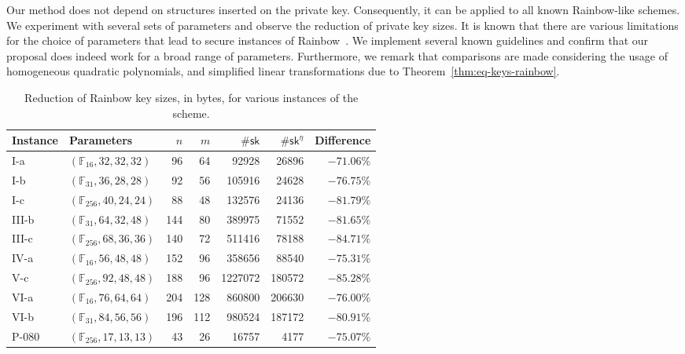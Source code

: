 \documentclass[12pt, a4paper, oneside]{memoir}
\theoremstyle{definition}
\begin{document}
Our method does not depend on structures inserted on the private key. Consequently, it can be applied to all known Rainbow-like schemes. We experiment with several sets of parameters and observe the reduction of private key sizes. It is known that there are various limitations for the choice of parameters that lead to secure instances of Rainbow~\cite{Petzoldt:201005}. We implement several known guidelines and confirm that our proposal does indeed work for a broad range of parameters. Furthermore, we remark that comparisons are made considering the usage of homogeneous quadratic polynomials, and simplified linear transformations due to Theorem~\ref{thm:eq-keys-rainbow}.

\begin{table}[htbp]
  \renewcommand{\arraystretch}{1.2}
  \setlength{\tabcolsep}{6.5pt}
  \centering
  \caption{Reduction of Rainbow key sizes, in bytes, for various instances of the scheme.}\label{tab:eta-diff}
  \begin{tabular}{*{2}{l}*{5}{r}}
    \toprule
    Instance & Parameters & $n$ & $m$ & $\#\mathsf{sk}$ & $\#\mathsf{sk}^{\eta}$ & Difference \\ \midrule
    I-a   & $(\mathbb{F}_{ 16}, 32, 32, 32)$ &  96 &  64 & \num{   92928} & \num{  26896} & $-71.06\%$ \\
    I-b   & $(\mathbb{F}_{ 31}, 36, 28, 28)$ &  92 &  56 & \num{  105916} & \num{  24628} & $-76.75\%$ \\
    I-c   & $(\mathbb{F}_{256}, 40, 24, 24)$ &  88 &  48 & \num{  132576} & \num{  24136} & $-81.79\%$ \\
    III-b & $(\mathbb{F}_{ 31}, 64, 32, 48)$ & 144 &  80 & \num{  389975} & \num{  71552} & $-81.65\%$ \\
    III-c & $(\mathbb{F}_{256}, 68, 36, 36)$ & 140 &  72 & \num{  511416} & \num{  78188} & $-84.71\%$ \\
    IV-a  & $(\mathbb{F}_{ 16}, 56, 48, 48)$ & 152 &  96 & \num{  358656} & \num{  88540} & $-75.31\%$ \\
    V-c   & $(\mathbb{F}_{256}, 92, 48, 48)$ & 188 &  96 & \num{ 1227072} & \num{ 180572} & $-85.28\%$ \\
    VI-a  & $(\mathbb{F}_{ 16}, 76, 64, 64)$ & 204 & 128 & \num{  860800} & \num{ 206630} & $-76.00\%$ \\
    VI-b  & $(\mathbb{F}_{ 31}, 84, 56, 56)$ & 196 & 112 & \num{  980524} & \num{ 187172} & $-80.91\%$ \\
    P-080 & $(\mathbb{F}_{256}, 17, 13, 13)$ &  43 &  26 & \num{   16757} & \num{   4177} & $-75.07\%$ \\

\end{tabular}
\end{table}
\end{document}
